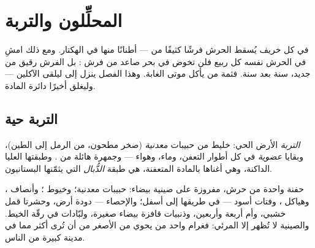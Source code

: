 \chapter{المحلِّلون والتربة}\label{ch:g6:decomposers-and-soil}

في كل خريف يُسقط الحرش فرشًا كثيفًا من  --- أطنانًا منها في
الهكتار. ومع ذلك امشِ في الحرش نفسه كل ربيع فلن تخوض في بحر صاعد
من فرش : بل الفرش رقيق من جديد، سنة بعد سنة. فثمة من يأكل
موتى الغابة. وهذا الفصل ينزل إلى  ليلقى الآكلين --- وليغلق
أخيرًا دائرة المادة.

\section{التربة حية}

\begin{definition}[التربة]\label{def:g6:decomposers-and-soil:soil}
\emph{التربة}  الأرض الحي: خليط من حبيبات
\emph{معدنية} (صخر مطحون، من الرمل إلى الطين)، وبقايا
\emph{عضوية} في كل أطوار التعفن، وماء، وهواء --- وجمهرة هائلة من
. وطبقتها العليا الداكنة، وهي أغناها بالمادة
المتعفنة، هي طبقة \emph{الدُّبال} التي يثمّنها
البستانيون.
\end{definition}

\begin{example}\label{ex:g6:decomposers-and-soil:handful}
حفنة واحدة من  حرش، مفروزة على صينية بيضاء: حبيبات معدنية؛
وخيوط ؛ وأنصاف ، وهياكل ، وفتات أسود --- 
في طريقها إلى أسفل؛ والإحصاء --- دودة أرض، وحشرتا قمل خشبي، وأم
أربعة وأربعين، وذنبيات قافزة بيضاء صغيرة، ولبّادات  في رقّة
الخيط. والصينية لا تُظهر إلا المرئي: فغرام واحد من  يحوي من
 الأصغر من أن تُرى أكثر مما في مدينة كبيرة من الناس.
\end{example}

